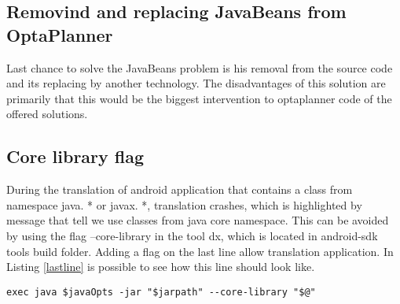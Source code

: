 \subsection{Removind and replacing JavaBeans from OptaPlanner}
Last chance to solve the JavaBeans problem is his removal from the source code and its replacing by another technology. The disadvantages of this solution are primarily that this would be the biggest intervention to optaplanner code of the offered solutions.

\subsection{Core library flag}
During the translation of android application that contains a class from namespace java. * or javax. *, translation crashes, which is highlighted by message that tell we use classes from java core namespace. This can be avoided by using the flag --core-library in the tool dx, which is located in android-sdk tools build folder. Adding a flag on the last line allow translation application. In Listing \ref{lastline} is possible to see how this line should look like.
\\
\begin{lstlisting}[captionpos={b},caption={Spanning tree broadcast algorithm.},frame={lines},label={lastline},basicstyle=\footnotesize]
exec java $javaOpts -jar "$jarpath" --core-library "$@"
\end{lstlisting}


